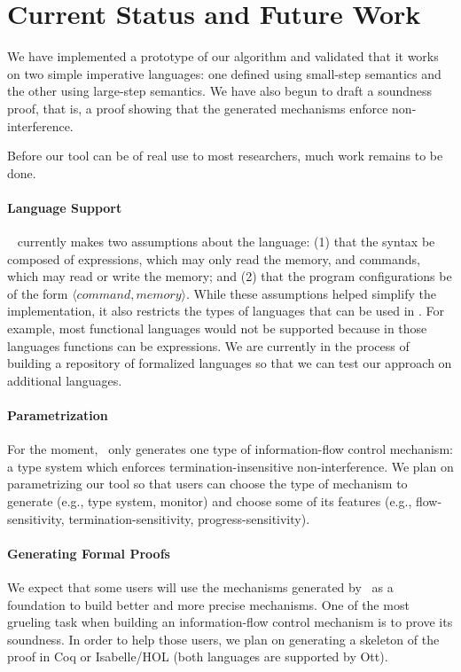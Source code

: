 \documentclass[sigplan,10pt]{acmart}\settopmatter{printfolios=true,printccs=false,printacmref=false}
\begin{document}
\section{Current Status and Future Work}
We have implemented a prototype of our algorithm and validated that it works on two simple imperative languages: one defined using small-step semantics and the other using large-step semantics. We have also begun to draft a soundness proof, that is, a proof showing that the generated mechanisms enforce non-interference.

Before our tool can be of real use to most researchers, much work remains to be done.

\paragraph{Language Support} \ottifc~ currently makes two assumptions about the language: (1) that the syntax be composed of expressions, which may only read the memory, and commands, which may read or write the memory; and (2) that the program configurations be of the form $\langle command, memory\rangle$. While these assumptions helped simplify the implementation, it also restricts the types of languages that can be used in \ottifc. For example, most functional languages would not be supported because in those languages functions can be expressions. We are currently in the process of building a repository of formalized languages so that we can test our approach on additional languages. 

\paragraph{Parametrization} For the moment, \ottifc\ only generates one type of information-flow control mechanism: a type system which enforces termination-insensitive non-interference. We plan on parametrizing our tool so that users can choose the type of mechanism to generate (e.g., type system, monitor) and choose some of its features (e.g., flow-sensitivity, termination-sensitivity, progress-sensitivity).

\paragraph{Generating Formal Proofs} We expect that some users will use the mechanisms generated by \ottifc\ as a foundation to build better and more precise mechanisms. One of the most grueling task when building an information-flow control mechanism is to prove its soundness. In order to help those users, we plan on generating a skeleton of the proof in Coq or Isabelle/HOL (both languages are supported by Ott).
\end{document}
